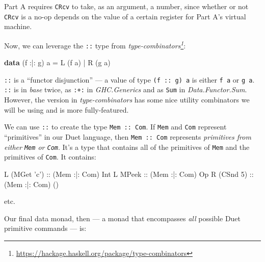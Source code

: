 \documentclass[]{article}
\newenvironment{Shaded}{}{}
\newcommand{\CharTok}[1]{\textcolor[rgb]{0.25,0.44,0.63}{#1}}
\newcommand{\DataTypeTok}[1]{\textcolor[rgb]{0.56,0.13,0.00}{#1}}
\newcommand{\DecValTok}[1]{\textcolor[rgb]{0.25,0.63,0.44}{#1}}
\newcommand{\FunctionTok}[1]{\textcolor[rgb]{0.02,0.16,0.49}{#1}}
\newcommand{\KeywordTok}[1]{\textcolor[rgb]{0.00,0.44,0.13}{\textbf{#1}}}
\newcommand{\NormalTok}[1]{#1}
\newcommand{\OtherTok}[1]{\textcolor[rgb]{0.00,0.44,0.13}{#1}}
\renewcommand{\href}[2]{#2\footnote{\url{#1}}}
\begin{document}
Part A requires \texttt{CRcv} to take, as an argument, a number, since whether
or not \texttt{CRcv} is a no-op depends on the value of a certain register for
Part A's virtual machine.

Now, we can leverage the \texttt{:\textbar{}:} type from
\emph{\href{https://hackage.haskell.org/package/type-combinators}{type-combinators}}:

\begin{Shaded}
\begin{Highlighting}[]
\KeywordTok{data}\NormalTok{ (f }\FunctionTok{:|:}\NormalTok{ g) a }\FunctionTok{=} \DataTypeTok{L}\NormalTok{ (f a)}
                 \FunctionTok{|} \DataTypeTok{R}\NormalTok{ (g a)}
\end{Highlighting}
\end{Shaded}

\texttt{:\textbar{}:} is a ``functor disjunction'' --- a value of type
\texttt{(f\ :\textbar{}:\ g)\ a} is either \texttt{f\ a} or \texttt{g\ a}.
\texttt{:\textbar{}:} is in \emph{base} twice, as \texttt{:+:} in
\emph{GHC.Generics} and as \texttt{Sum} in \emph{Data.Functor.Sum}. However, the
version in \emph{type-combinators} has some nice utility combinators we will be
using and is more fully-featured.

We can use \texttt{:\textbar{}:} to create the type
\texttt{Mem\ :\textbar{}:\ Com}. If \texttt{Mem} and \texttt{Com} represent
``primitives'' in our Duet language, then \texttt{Mem\ :\textbar{}:\ Com}
represents \emph{primitives from either \texttt{Mem} or \texttt{Com}}. It's a
type that contains all of the primitives of \texttt{Mem} and the primitives of
\texttt{Com}. It contains:

\begin{Shaded}
\begin{Highlighting}[]
\DataTypeTok{L}\NormalTok{ (}\DataTypeTok{MGet} \CharTok{'c'}\NormalTok{)}\OtherTok{ ::}\NormalTok{ (}\DataTypeTok{Mem} \FunctionTok{:|:} \DataTypeTok{Com}\NormalTok{) }\DataTypeTok{Int}
\DataTypeTok{L} \DataTypeTok{MPeek}\OtherTok{      ::}\NormalTok{ (}\DataTypeTok{Mem} \FunctionTok{:|:} \DataTypeTok{Com}\NormalTok{) }\DataTypeTok{Op}
\DataTypeTok{R}\NormalTok{ (}\DataTypeTok{CSnd} \DecValTok{5}\NormalTok{)}\OtherTok{   ::}\NormalTok{ (}\DataTypeTok{Mem} \FunctionTok{:|:} \DataTypeTok{Com}\NormalTok{) ()}
\end{Highlighting}
\end{Shaded}

etc.

Our final data monad, then --- a monad that encompasses \emph{all} possible Duet
primitive commands --- is:
\end{document}
